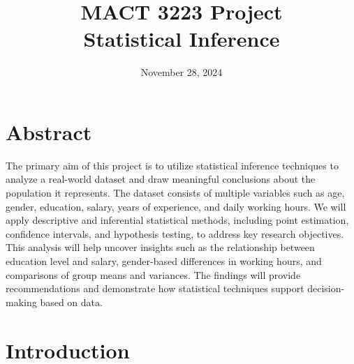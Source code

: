 \documentclass[12pt,a4paper]{article}
\title{MACT 3223 Project\\ \Large{Statistical Inference}}
\date{November 28, 2024}
\begin{document}
\maketitle
\vspace{3cm}
\section*{Abstract}
The primary aim of this project is to utilize statistical inference techniques to analyze a real-world dataset and draw meaningful conclusions about the population it represents. The dataset consists of multiple variables such as age, gender, education, salary, years of experience, and daily working hours. We will apply descriptive and inferential statistical methods, including point estimation, confidence intervals, and hypothesis testing, to address key research objectives. This analysis will help uncover insights such as the relationship between education level and salary, gender-based differences in working hours, and comparisons of group means and variances. The findings will provide recommendations and demonstrate how statistical techniques support decision-making based on data.

\newpage
\tableofcontents
\newpage
\section{Introduction}
\end{document}
